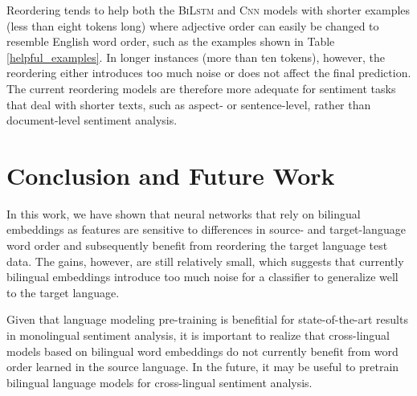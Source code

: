 \documentclass[a4paper,11pt,twocolumn,twoside]{article}
\newcommand{\bilstm}{\textsc{BiLstm}\xspace}
\newcommand{\cnn}{\textsc{Cnn}\xspace}
\begin{document}
Reordering tends to help both the \bilstm and \cnn models with shorter examples (less than eight tokens long) where adjective order can easily be changed to resemble English word order, such as the examples shown in Table \ref{helpful_examples}. In longer instances (more than ten tokens), however, the reordering either introduces too much noise or does not affect the final prediction. The current reordering models are therefore more adequate for sentiment tasks that deal with shorter texts, such as aspect- or sentence-level, rather than document-level sentiment analysis.


\section{Conclusion and Future Work}

In this work, we have shown that neural networks that rely on bilingual embeddings as features
are sensitive to differences in source- and target-language word order and subsequently benefit from reordering the target language test data. The gains, however, are still relatively small, which suggests that currently bilingual embeddings introduce too much noise for a classifier to generalize well to the target language.

Given that language modeling pre-training is benefitial for state-of-the-art results in monolingual sentiment analysis, it is important to realize that cross-lingual models based on bilingual word embeddings do not currently benefit from word order learned in the source language. In the future, it may be useful to pretrain bilingual language models for cross-lingual sentiment analysis.





\end{document}
